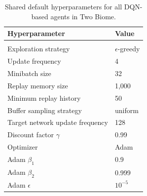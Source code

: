 \begin{table}[H]
    \caption{Shared default hyperparameters for all DQN-based agents in Two Biome.}
    \begin{center}
        \begin{tabular}{ll}
            \multicolumn{1}{l}{\bf Hyperparameter} & \multicolumn{1}{l}{\bf Value}
            \\ \hline \\
            Exploration strategy            & $\epsilon$-greedy \\
            Update frequency                & 4 \\
            Minibatch size                  & 32 \\
            Replay memory size              & 1{,}000 \\
            Minimum replay history          & 50 \\
            Buffer sampling strategy        & uniform \\
            Target network update frequency & 128 \\
            Discount factor $\gamma$        & 0.99 \\
            Optimizer                       & Adam \\
            Adam $\beta_1$                  & 0.9 \\
            Adam $\beta_2$                  & 0.999 \\
            Adam $\epsilon$                 & $10^{-5}$ \\
        \end{tabular}
    \end{center}
    \label{tab:dqn_defaults}
\end{table}


